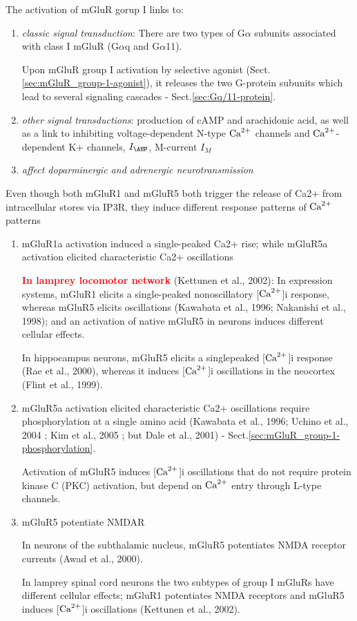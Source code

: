 The activation of mGluR gorup I links to:
\begin{enumerate}
  
  \item {\it classic signal transduction}: There are two types of G$\alpha$
  subunits associated with class I mGluR (G$\alpha$q and G$\alpha$11).
  
  Upon mGluR group I activation by selective agonist
  (Sect.\ref{sec:mGluR_group-1-agonist}), it releases the two G-protein subunits
  which lead to several signaling cascades - Sect.\ref{sec:Gq/11-protein}.
  
  
   \item {\it other signal transductions}: production of cAMP and arachidonic
   acid, as well as a link to inhibiting voltage-dependent N-type ${\text{Ca}^{2+}}$ channels
   and ${\text{Ca}^{2+}}$-dependent K+ channels, $I_\AHP$, M-current $I_M$ 
   \citep{anwyl1999}
   
   \item {\it affect doparminergic and adrenergic neurotransmission}
\end{enumerate}

Even though both mGluR1 and mGluR5  both trigger the release of Ca2+ from
intracellular stores via IP3R, they induce different response patterns of ${\text{Ca}^{2+}}$
patterns
\begin{enumerate}
  
  \item  mGluR1a activation induced a single-peaked Ca2+ rise; while mGluR5a
  activation elicited characteristic Ca2+
 oscillations

\textcolor{red}{\bf In lamprey locomotor network} (Kettunen et al., 2002):
In expression systems, mGluR1 elicits a single-peaked nonoscillatory [${\text{Ca}^{2+}}$]i
response, whereas mGluR5 elicits oscillations (Kawabata et al., 1996; Nakanishi
et al., 1998); and an activation of native mGluR5 in neurons
induces different cellular effects. 

In hippocampus neurons, mGluR5 elicits a singlepeaked [${\text{Ca}^{2+}}$]i response (Rae et
al., 2000), whereas it induces [${\text{Ca}^{2+}}$]i oscillations in the neocortex (Flint et
al., 1999). 

    \item mGluR5a activation elicited characteristic Ca2+
 oscillations require phosphorylation at a single amino acid (Kawabata et al.,
 1996; Uchino et al., 2004 ; Kim et al., 2005 ; but Dale et al., 2001) -
 Sect.\ref{sec:mGluR_group-1-phosphorylation}.
    
    
Activation of mGluR5 induces [${\text{Ca}^{2+}}$]i oscillations that do not require protein
kinase C (PKC) activation, but depend on ${\text{Ca}^{2+}}$ entry through L-type channels. 
  
   \item mGluR5 potentiate NMDAR 
   
In neurons of the subthalamic nucleus, mGluR5 potentiates NMDA receptor currents
(Awad et al., 2000).


In lamprey spinal cord neurons the two subtypes of group I mGluRs have different
cellular effects; mGluR1 potentiates NMDA receptors and mGluR5 induces [${\text{Ca}^{2+}}$]i
oscillations (Kettunen et al., 2002).

\end{enumerate}

